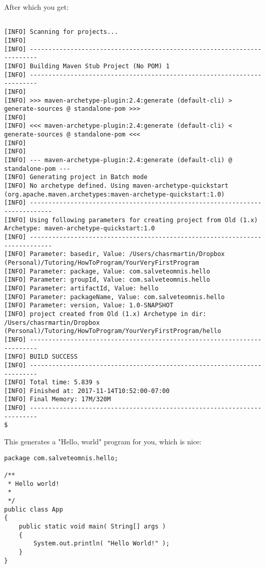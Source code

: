 \documentclass[11pt]{article}
\begin{document}
After which you get:
\begin{verbatim}

[INFO] Scanning for projects...
[INFO] 
[INFO] ------------------------------------------------------------------------
[INFO] Building Maven Stub Project (No POM) 1
[INFO] ------------------------------------------------------------------------
[INFO] 
[INFO] >>> maven-archetype-plugin:2.4:generate (default-cli) > generate-sources @ standalone-pom >>>
[INFO] 
[INFO] <<< maven-archetype-plugin:2.4:generate (default-cli) < generate-sources @ standalone-pom <<<
[INFO] 
[INFO] 
[INFO] --- maven-archetype-plugin:2.4:generate (default-cli) @ standalone-pom ---
[INFO] Generating project in Batch mode
[INFO] No archetype defined. Using maven-archetype-quickstart (org.apache.maven.archetypes:maven-archetype-quickstart:1.0)
[INFO] ----------------------------------------------------------------------------
[INFO] Using following parameters for creating project from Old (1.x) Archetype: maven-archetype-quickstart:1.0
[INFO] ----------------------------------------------------------------------------
[INFO] Parameter: basedir, Value: /Users/chasrmartin/Dropbox (Personal)/Tutoring/HowToProgram/YourVeryFirstProgram
[INFO] Parameter: package, Value: com.salveteomnis.hello
[INFO] Parameter: groupId, Value: com.salveteomnis.hello
[INFO] Parameter: artifactId, Value: hello
[INFO] Parameter: packageName, Value: com.salveteomnis.hello
[INFO] Parameter: version, Value: 1.0-SNAPSHOT
[INFO] project created from Old (1.x) Archetype in dir: /Users/chasrmartin/Dropbox (Personal)/Tutoring/HowToProgram/YourVeryFirstProgram/hello
[INFO] ------------------------------------------------------------------------
[INFO] BUILD SUCCESS
[INFO] ------------------------------------------------------------------------
[INFO] Total time: 5.839 s
[INFO] Finished at: 2017-11-14T10:52:00-07:00
[INFO] Final Memory: 17M/320M
[INFO] ------------------------------------------------------------------------
$
\end{verbatim}

This generates a "Hello, world" program for you, which is nice:

\begin{verbatim}
package com.salveteomnis.hello;

/**
 * Hello world!
 *
 */
public class App 
{
    public static void main( String[] args )
    {
        System.out.println( "Hello World!" );
    }
}

\end{verbatim}
\end{document}

